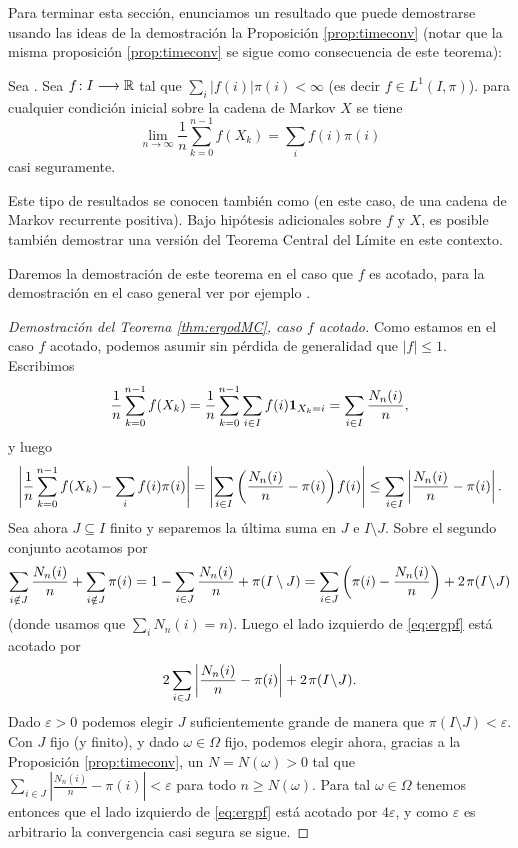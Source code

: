 Para terminar esta sección, enunciamos un resultado que puede demostrarse usando las ideas de la demostración la Proposición \ref{prop:timeconv} (notar que la misma proposición \ref{prop:timeconv} se sigue como consecuencia de este teorema):

\begin{thm}\label{thm:ergodMC}
Sea .
Sea $f\!:I\longrightarrow\mathbb{R}$ tal que $\sum_i|f(i)|\pi(i)<\infty$ (es decir $f\in L^1(I,\pi)$).
 para cualquier condición inicial sobre la cadena de Markov $X$ se tiene
\[\lim_{n\to\infty}\frac1{n}\sum_{k=0}^{n-1}f(X_k)=\sum_if(i)\pi(i)\]
casi seguramente.
\end{thm}

Este tipo de resultados se conocen también como  (en este caso, de una cadena de Markov recurrente positiva).
Bajo hipótesis adicionales sobre $f$ y $X$, es posible también demostrar una versión del Teorema Central del Límite en este contexto.

Daremos la demostración de este teorema en el caso que $f$ es acotado, para la demostración en el caso general ver por ejemplo \cite[Ejer. 6.6.4]{durrett}.

\begin{proof}[Demostración del Teorema \ref{thm:ergodMC}, caso $f$ acotado]
Como estamos en el caso $f$ acotado, podemos asumir sin pérdida de generalidad que $|f|\leq1$.
Escribimos
\[\frac1{n}\sum_{k=0}^{n-1}f(X_k)=\frac1{n}\sum_{k=0}^{n-1}\sum_{i\in I}f(i)\mathbf{1}_{X_k=i}=\sum_{i\in I}\frac{N_n(i)}{n},\]
y luego
\begin{equation}\label{eq:ergpf}
\left|\frac1{n}\sum_{k=0}^{n-1}f(X_k)-\sum_if(i)\pi(i)\right|
=\left|\sum_{i\in I}\left(\frac{N_n(i)}{n}-\pi(i)\right)\hspace{-0.1em} f(i)\right|
\leq\sum_{i\in I}\left|\frac{N_n(i)}{n}-\pi(i)\right|.
\end{equation}
Sea ahora $J\subseteq I$ finito y separemos la última suma en $J$ e $I\!\setminus\!J$.
Sobre el segundo conjunto acotamos por
\[\sum_{i\notin J}\frac{N_n(i)}{n}+\sum_{i\notin J}\pi(i)=1-\sum_{i\in J}\frac{N_n(i)}{n}+\pi(I\setminus J)=\sum_{i\in J}\left(\pi(i)-\frac{N_n(i)}{n}\right)+2\hspace{0.1em}\pi(I\!\setminus\!J)\]
(donde usamos que $\sum_iN_n(i)=n$).
Luego el lado izquierdo de \eqref{eq:ergpf} está acotado por
\[2\sum_{i\in J}\left|\frac{N_n(i)}{n}-\pi(i)\right|+2\hspace{0.1em}\pi(I\!\setminus\!J).\]
Dado $\varepsilon>0$ podemos elegir $J$ suficientemente grande de manera que $\pi(I\!\setminus\!J)<\varepsilon$.
Con $J$ fijo (y finito), y dado $\omega\in\Omega$ fijo, podemos elegir ahora, gracias a la Proposición \ref{prop:timeconv}, un $N=N(\omega)>0$ tal que $\sum_{i\in J}\left|\frac{N_n(i)}{n}-\pi(i)\right|<\varepsilon$ para todo $n\geq N(\omega)$.
Para tal $\omega\in\Omega$ tenemos entonces que el lado izquierdo de \eqref{eq:ergpf} está acotado por $4\varepsilon$, y como $\varepsilon$ es arbitrario la convergencia casi segura se sigue.
\end{proof}

